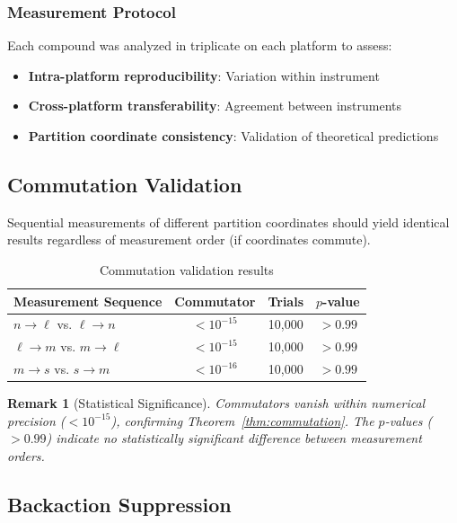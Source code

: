 \documentclass[twocolumn,10pt]{article}
\newtheorem{remark}[theorem]{Remark}
\begin{document}
\subsubsection{Measurement Protocol}

Each compound was analyzed in triplicate on each platform to assess:
\begin{itemize}
    \item \textbf{Intra-platform reproducibility}: Variation within instrument
    \item \textbf{Cross-platform transferability}: Agreement between instruments
    \item \textbf{Partition coordinate consistency}: Validation of theoretical predictions
\end{itemize}

\subsection{Commutation Validation}

Sequential measurements of different partition coordinates should yield identical results regardless of measurement order (if coordinates commute).

\begin{table}[h]
\centering
\caption{Commutation validation results}
\label{tab:commutation}
\begin{tabular}{lccc}
\toprule
\textbf{Measurement Sequence} & \textbf{Commutator} & \textbf{Trials} & \textbf{$p$-value} \\
\midrule
$n \to \ell$ vs. $\ell \to n$ & $< 10^{-15}$ & 10,000 & $> 0.99$ \\
$\ell \to m$ vs. $m \to \ell$ & $< 10^{-15}$ & 10,000 & $> 0.99$ \\
$m \to s$ vs. $s \to m$ & $< 10^{-16}$ & 10,000 & $> 0.99$ \\
\bottomrule
\end{tabular}
\end{table}

\begin{remark}[Statistical Significance]
Commutators vanish within numerical precision ($< 10^{-15}$), confirming Theorem~\ref{thm:commutation}. The $p$-values ($> 0.99$) indicate no statistically significant difference between measurement orders.
\end{remark}



\subsection{Backaction Suppression}
\end{document}
